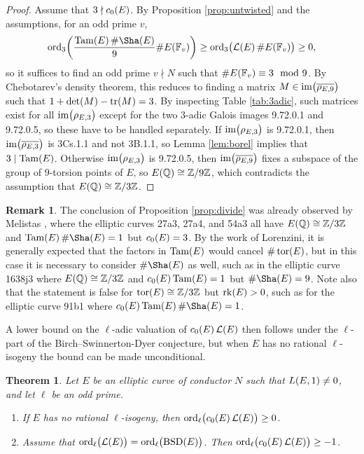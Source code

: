 \documentclass{article}
\theoremstyle{plain}
\newtheorem{theorem}[n]{Theorem}
\theoremstyle{definition}
\newtheorem{remark}[n]{Remark}
\newcommand{\BSD}{\operatorname{BSD}}
\newcommand{\FF}{\mathbb{F}}
\newcommand{\im}{\operatorname{im}}
\newcommand{\LLL}{\mathcal{L}}
\newcommand{\ord}{\operatorname{ord}}
\newcommand{\QQ}{\mathbb{Q}}
\newcommand{\rk}{\operatorname{rk}}
\newcommand{\Tam}{\operatorname{Tam}}
\newcommand{\tor}{\operatorname{tor}}
\newcommand{\tr}{\operatorname{tr}}
\newcommand{\ZZ}{\mathbb{Z}}
\newcommand{\br}{\!\del}
\begin{document}
\begin{proof}
Assume that $ 3 \nmid c_0\br{E} $. By Proposition \ref{prop:untwisted} and the assumptions, for an odd prime $ v $,
$$ \ord_3\br{\dfrac{\Tam\br{E}\#\Sha\br{E}}{9}\#E\br{\FF_v}} \ge \ord_3\br{\LLL\br{E}\#E\br{\FF_v}} \ge 0, $$
so it suffices to find an odd prime $ v \nmid N $ such that $ \#E\br{\FF_v} \equiv 3 \mod 9 $. By Chebotarev's density theorem, this reduces to finding a matrix $ M \in \im\br{\overline{\rho_{E, 9}}} $ such that $ 1 + \det\br{M} - \tr\br{M} = 3 $. By inspecting Table \ref{tab:3adic}, such matrices exist for all $ \im\br{\rho_{E, 3}} $ except for the two $ 3 $-adic Galois images 9.72.0.1 and 9.72.0.5, so these have to be handled separately. If $ \im\br{\rho_{E, 3}} $ is 9.72.0.1, then $ \im\br{\overline{\rho_{E, 3}}} $ is 3Cs.1.1 and not 3B.1.1, so Lemma \ref{lem:borel} implies that $ 3 \mid \Tam\br{E} $. Otherwise $ \im\br{\rho_{E, 3}} $ is 9.72.0.5, then $ \im\br{\overline{\rho_{E, 9}}} $ fixes a subspace of the group of $ 9 $-torsion points of $ E $, so $ E\br{\QQ} \cong \ZZ / 9\ZZ $, which contradicts the assumption that $ E\br{\QQ} \cong \ZZ / 3\ZZ $.
\end{proof}

\begin{remark}
The conclusion of Proposition \ref{prop:divide} was already observed by Melistas \cite[Example 3.8]{Mel23}, where the elliptic curves 27a3, 27a4, and 54a3 all have $ E\br{\QQ} \cong \ZZ / 3\ZZ $ and $ \Tam\br{E}\#\Sha\br{E} = 1 $ but $ c_0\br{E} = 3 $. By the work of Lorenzini, it is generally expected that the factors in $ \Tam\br{E} $ would cancel $ \#\tor\br{E} $, but in this case it is necessary to consider $ \#\Sha\br{E} $ as well, such as in the elliptic curve 1638j3 where $ E\br{\QQ} \cong \ZZ / 3\ZZ $ and $ c_0\br{E}\Tam\br{E} = 1 $ but $ \#\Sha\br{E} = 9 $. Note also that the statement is false for $ \tor\br{E} \cong \ZZ / 3\ZZ $ but $ \rk\br{E} > 0 $, such as for the elliptic curve 91b1 where $ c_0\br{E}\Tam\br{E}\#\Sha\br{E} = 1 $.
\end{remark}

\pagebreak

A lower bound on the $ \ell $-adic valuation of $ c_0\br{E}\LLL\br{E} $ then follows under the $ \ell $-part of the Birch--Swinnerton-Dyer conjecture, but when $ E $ has no rational $ \ell $-isogeny the bound can be made unconditional.

\begin{theorem}
\label{thm:valuation}
Let $ E $ be an elliptic curve of conductor $ N $ such that $ L\br{E, 1} \ne 0 $, and let $ \ell $ be an odd prime.
\begin{enumerate}
\item If $ E $ has no rational $ \ell $-isogeny, then $ \ord_\ell\br{c_0\br{E}\LLL\br{E}} \ge 0 $.
\item Assume that $ \ord_\ell\br{\LLL\br{E}} = \ord_\ell\br{\BSD\br{E}} $. Then $ \ord_\ell\br{c_0\br{E}\LLL\br{E}} \ge -1 $.
\end{enumerate}
\end{theorem}
\end{document}
